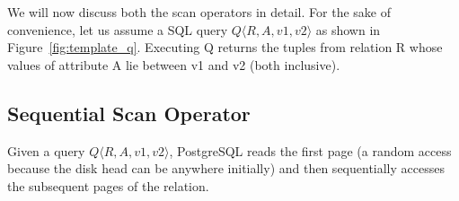 \documentclass{article}
\begin{document}
\begin{multicols}{2}
\begin{center}
		\label{fig:sqlquery3}
	\end{center}


	We will now discuss both the scan operators in detail. For the sake of convenience, let us assume a SQL query $Q \langle R,A,v1,v2 \rangle $ as shown in Figure~\ref{fig:template_q}. Executing Q returns the tuples from relation R whose values of attribute A lie between v1 and v2 (both inclusive). 

	\subsection{Sequential Scan Operator}
	Given a query $Q \langle R,A,v1,v2 \rangle $, PostgreSQL reads the first page (a random access because the disk head can be anywhere initially) and then sequentially accesses the subsequent pages of the relation.
	

\end{multicols}
\end{document}
